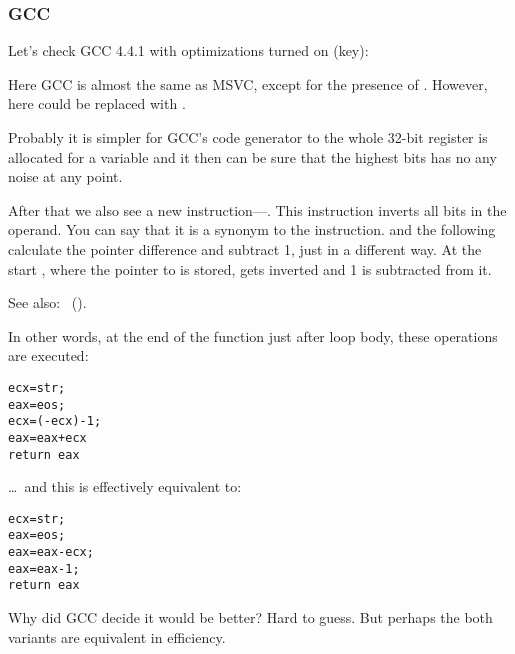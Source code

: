 \ifdefined\IncludeGCC
\subsubsection{\Optimizing GCC}

Let's check GCC 4.4.1 with optimizations turned on (\Othree key):


 
Here GCC is almost the same as MSVC, except for the presence of \MOVZX.
However, here \MOVZX could be replaced with .

Probably it is simpler for GCC's code generator to  
the whole 32-bit \EDX register 
is allocated for a \Tchar variable and it then can be sure that the highest bits has no any noise 
at any point.

\label{strlen_NOT_ADD}

After that we also see a new instruction---\NOT. This instruction inverts all bits in the operand. 
You can say that it is a synonym to the  instruction. 
\NOT and the following \ADD calculate the pointer difference and subtract 1, just in a different way. 
At the start \ECX, where the pointer to  is stored, gets inverted and 1 is subtracted from it.

See also: \q{\SignedNumbersSectionName}~().
 
In other words, at the end of the function just after loop body, these operations are executed:

\begin{lstlisting}
ecx=str;
eax=eos;
ecx=(-ecx)-1; 
eax=eax+ecx
return eax
\end{lstlisting}

\dots~and this is effectively equivalent to:

\begin{lstlisting}
ecx=str;
eax=eos;
eax=eax-ecx;
eax=eax-1;
return eax
\end{lstlisting}

Why did GCC decide it would be better? Hard to guess. 
But perhaps the both variants are equivalent in efficiency.
\fi
